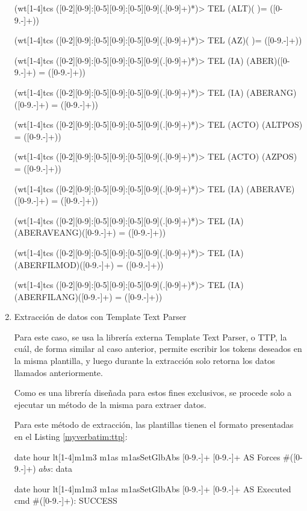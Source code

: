 \begin{enumerate}
\begin{myverbatim}[caption={Plantillas Regex},label={myverbatim:regex}]
(wt[1-4]tcs ([0-2][0-9]:[0-5][0-9]:[0-5][0-9](.[0-9]+)*)> TEL (ALT)( )= ([0-9.-]+))

(wt[1-4]tcs ([0-2][0-9]:[0-5][0-9]:[0-5][0-9](.[0-9]+)*)> TEL (AZ)( )= ([0-9.-]+))

(wt[1-4]tcs ([0-2][0-9]:[0-5][0-9]:[0-5][0-9](.[0-9]+)*)> TEL (IA) (ABER)([0-9.-]+) = ([0-9.-]+))

(wt[1-4]tcs ([0-2][0-9]:[0-5][0-9]:[0-5][0-9](.[0-9]+)*)> TEL (IA) (ABERANG)([0-9.-]+) = ([0-9.-]+))

(wt[1-4]tcs ([0-2][0-9]:[0-5][0-9]:[0-5][0-9](.[0-9]+)*)> TEL (ACTO) (ALTPOS) = ([0-9.-]+))

(wt[1-4]tcs ([0-2][0-9]:[0-5][0-9]:[0-5][0-9](.[0-9]+)*)> TEL (ACTO) (AZPOS) = ([0-9.-]+))

(wt[1-4]tcs ([0-2][0-9]:[0-5][0-9]:[0-5][0-9](.[0-9]+)*)> TEL (IA) (ABERAVE)([0-9.-]+) = ([0-9.-]+))

(wt[1-4]tcs ([0-2][0-9]:[0-5][0-9]:[0-5][0-9](.[0-9]+)*)> TEL (IA) (ABERAVEANG)([0-9.-]+) = ([0-9.-]+))

(wt[1-4]tcs ([0-2][0-9]:[0-5][0-9]:[0-5][0-9](.[0-9]+)*)> TEL (IA) (ABERFILMOD)([0-9.-]+) = ([0-9.-]+))

(wt[1-4]tcs ([0-2][0-9]:[0-5][0-9]:[0-5][0-9](.[0-9]+)*)> TEL (IA) (ABERFILANG)([0-9.-]+) = ([0-9.-]+))
    
    \end{myverbatim}

    \item{Extracción de datos con Template Text Parser}

    Para este caso, se usa la librería externa Template Text Parser, o TTP, la cuál, de forma similar al caso anterior, permite escribir los tokens deseados en la misma plantilla, y luego durante la extracción solo retorna los datos llamados anteriormente.

    Como es una librería diseñada para estos fines exclusivos, se procede solo a ejecutar un método de la misma para extraer datos.

    Para este método de extracción, las plantillas tienen el formato presentadas en el Listing \ref{myverbatim:ttp}:

    \begin{myverbatim}[caption={Plantillas TTP},label={myverbatim:ttp}]

{{ date }} {{ hour }} lt[1-4]m1m3 m1as m1asSetGlbAbs [0-9.-]+ [0-9.-]+ AS Forces #([0-9.-]+) \(abs\): {{ data }}

{{ date }} {{ hour }} lt[1-4]m1m3 m1as m1asSetGlbAbs [0-9.-]+ [0-9.-]+ AS Executed cmd #([0-9.-]+): SUCCESS


\end{myverbatim}
\end{enumerate}
